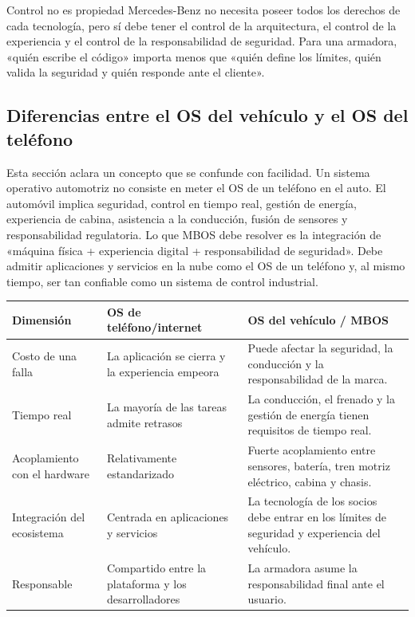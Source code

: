 \documentclass[a4paper]{article}
\begin{document}
\begin{importantbox}{Control no es propiedad}
Mercedes-Benz no necesita poseer todos los derechos de cada tecnología, pero sí debe tener el control de la arquitectura, el control de la experiencia y el control de la responsabilidad de seguridad. Para una armadora, «quién escribe el código» importa menos que «quién define los límites, quién valida la seguridad y quién responde ante el cliente».
\end{importantbox}

\subsection{Diferencias entre el OS del vehículo y el OS del teléfono}

Esta sección aclara un concepto que se confunde con facilidad. Un sistema operativo automotriz no consiste en meter el OS de un teléfono en el auto. El automóvil implica seguridad, control en tiempo real, gestión de energía, experiencia de cabina, asistencia a la conducción, fusión de sensores y responsabilidad regulatoria. Lo que MBOS debe resolver es la integración de «máquina física + experiencia digital + responsabilidad de seguridad». Debe admitir aplicaciones y servicios en la nube como el OS de un teléfono y, al mismo tiempo, ser tan confiable como un sistema de control industrial.

\noindent\begin{tabularx}{\textwidth}{p{}p{}X}
\toprule
Dimensión & OS de teléfono/internet & OS del vehículo / MBOS \\
\midrule
Costo de una falla & La aplicación se cierra y la experiencia empeora & Puede afectar la seguridad, la conducción y la responsabilidad de la marca. \\
Tiempo real & La mayoría de las tareas admite retrasos & La conducción, el frenado y la gestión de energía tienen requisitos de tiempo real. \\
Acoplamiento con el hardware & Relativamente estandarizado & Fuerte acoplamiento entre sensores, batería, tren motriz eléctrico, cabina y chasis. \\
Integración del ecosistema & Centrada en aplicaciones y servicios & La tecnología de los socios debe entrar en los límites de seguridad y experiencia del vehículo. \\
Responsable & Compartido entre la plataforma y los desarrolladores & La armadora asume la responsabilidad final ante el usuario. \\
\bottomrule
\end{tabularx}
\end{document}

